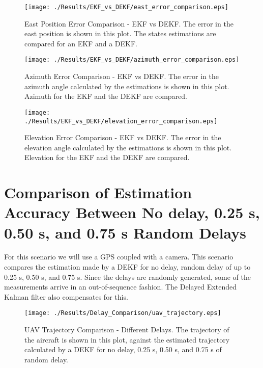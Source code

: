 \begin{figure}[H]
  \centering
  \texttt{[image: ./Results/EKF\_vs\_DEKF/east\_error\_comparison.eps]}
  \caption[East Position Error Comparison - EKF vs DEKF]{East Position Error Comparison - EKF vs DEKF. The error in the east position is shown in this plot. The states estimations are compared for an EKF and a DEKF.}
\end{figure}

\begin{figure}[H]
  \centering
  \texttt{[image: ./Results/EKF\_vs\_DEKF/azimuth\_error\_comparison.eps]}
  \caption[Azimuth Error Comparison - EKF vs DEKF]{Azimuth Error Comparison - EKF vs DEKF. The error in the azimuth angle calculated by the estimations is shown in this plot. Azimuth for the EKF and the DEKF are compared.}
\end{figure}

\begin{figure}[H]
  \centering
  \texttt{[image: ./Results/EKF\_vs\_DEKF/elevation\_error\_comparison.eps]}
  \caption[Elevation Error Comparison - EKF vs DEKF]{Elevation Error Comparison - EKF vs DEKF. The error in the elevation angle calculated by the estimations is shown in this plot. Elevation for the EKF and the DEKF are compared.}
\end{figure}

\section{Comparison of Estimation Accuracy Between No delay, 0.25 s, 0.50 s, and 0.75 s Random Delays}
For this scenario we will use a GPS coupled with a camera. This scenario compares the estimation made by a DEKF for no delay, random delay of up to 0.25 s, 0.50 s, and 0.75 s. Since the delays are randomly generated, some of the measurements arrive in an out-of-sequence fashion. The Delayed Extended Kalman filter also compensates for this.


\begin{figure}[H]
  \centering
  \texttt{[image: ./Results/Delay\_Comparison/uav\_trajectory.eps]}
  \caption[UAV Trajectory Comparison - Different Delays]{UAV Trajectory Comparison - Different Delays. The trajectory of the aircraft is shown in this plot, against the estimated trajectory calculated by a DEKF for no delay, 0.25 s, 0.50 s, and 0.75 s of random delay.}
\end{figure}


